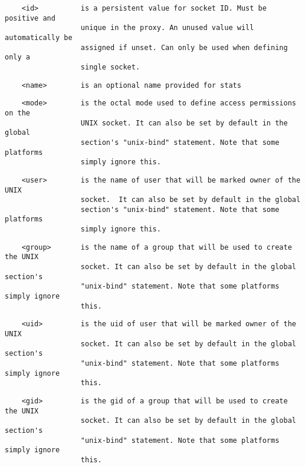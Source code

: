 \begin{verbatim}
    <id>          is a persistent value for socket ID. Must be positive and
                  unique in the proxy. An unused value will automatically be
                  assigned if unset. Can only be used when defining only a
                  single socket.
\end{verbatim}

\begin{verbatim}
    <name>        is an optional name provided for stats
\end{verbatim}

\begin{verbatim}
    <mode>        is the octal mode used to define access permissions on the
                  UNIX socket. It can also be set by default in the global
                  section's "unix-bind" statement. Note that some platforms
                  simply ignore this.
\end{verbatim}

\begin{verbatim}
    <user>        is the name of user that will be marked owner of the UNIX
                  socket.  It can also be set by default in the global
                  section's "unix-bind" statement. Note that some platforms
                  simply ignore this.
\end{verbatim}

\begin{verbatim}
    <group>       is the name of a group that will be used to create the UNIX
                  socket. It can also be set by default in the global section's
                  "unix-bind" statement. Note that some platforms simply ignore
                  this.
\end{verbatim}

\begin{verbatim}
    <uid>         is the uid of user that will be marked owner of the UNIX
                  socket. It can also be set by default in the global section's
                  "unix-bind" statement. Note that some platforms simply ignore
                  this.
\end{verbatim}

\begin{verbatim}
    <gid>         is the gid of a group that will be used to create the UNIX
                  socket. It can also be set by default in the global section's
                  "unix-bind" statement. Note that some platforms simply ignore
                  this.
\end{verbatim}

